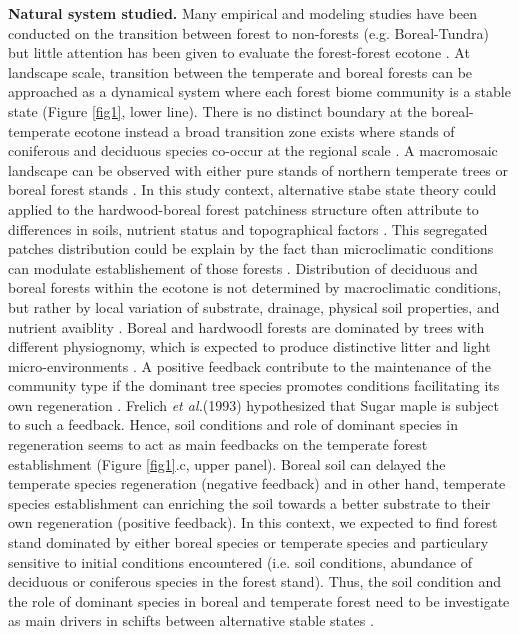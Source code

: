 \textbf{Natural system studied.} Many empirical and modeling studies have been
conducted on the transition between forest to non-forests (e.g. Boreal-Tundra) 
\cite{Scheffer2012,Scheffer2001,Hirota2011,Messaoud2007} but little
attention has been given to evaluate the forest-forest ecotone
\cite{Goldblum2010,Graignic2013,Messaoud2007}. At landscape scale, transition
between  the temperate and boreal forests can be approached as a dynamical
system where each forest biome community is a stable state (Figure \ref{fig1},
lower line). There is no distinct boundary at the boreal-temperate ecotone
instead a broad transition zone exists where stands of coniferous and
deciduous species co-occur at the regional scale
\cite{Goldblum2010,Fisichelli2013}. A macromosaic landscape can be observed
with either pure stands of northern temperate trees or boreal forest stands
\cite{Goldblum2010,Fisichelli2013}. In this study context, alternative stabe
state theory could applied to the hardwood-boreal forest patchiness structure
often attribute to differences in soils, nutrient status and topographical
factors \cite{Society2014}. This segregated patches distribution could be
explain by the fact than microclimatic conditions can modulate establishement
of those forests \cite{DeFrenne2013}. Distribution of deciduous and boreal
forests within the ecotone is not determined by macroclimatic conditions, but
rather by local variation of substrate, drainage, physical soil properties,
and nutrient avaiblity \cite{Goldblum2010,Society2014}. Boreal and hardwoodl
forests are dominated by trees with different physiognomy, which is expected
to produce distinctive litter and light micro-environments \cite{Barras1998}.
A positive feedback contribute to the maintenance of the community type if the
dominant tree species promotes conditions facilitating its own regeneration
\cite{Barras1998}. Frelich \textit{et al.}(1993) \cite{Society2014}
hypothesized that Sugar maple is subject to such a feedback. Hence, soil
conditions and role of dominant species in regeneration seems to act as main
feedbacks on the temperate forest establishment (Figure \ref{fig1}.c, upper
panel). Boreal soil can delayed the temperate species regeneration (negative
feedback) and in other hand, temperate species establishment can enriching the
soil towards a better substrate to their own regeneration (positive feedback).
In this context, we expected to find forest stand dominated by either boreal
species or temperate species and particulary sensitive to initial conditions
encountered (i.e. soil conditions, abundance of deciduous or coniferous
species in the forest stand). Thus, the soil condition and the role of
dominant species in boreal and temperate forest need to be investigate as main
drivers in schifts between alternative stable states
\cite{Kellman2004,Moore2008,DeFrenne2013,Barras1998}.

